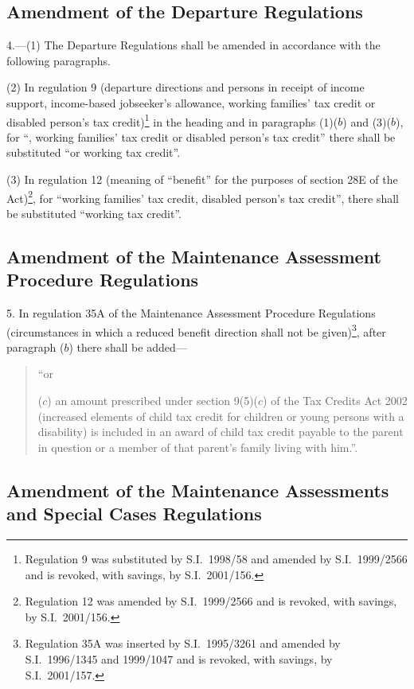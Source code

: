 \documentclass[12pt,a4paper]{article}
\begin{document}
\subsection[4. Amendment of the Departure Regulations]{Amendment of the Departure Regulations}

4.---(1)  The Departure Regulations shall be amended in accordance with the following paragraphs.

(2) In regulation 9 (departure directions and persons in receipt of income support, income-based jobseeker’s allowance, working families' tax credit or disabled person’s tax credit)\footnote{Regulation 9 was substituted by S.I.\ 1998/58 and amended by S.I.\ 1999/2566 and is revoked, with savings, by S.I.\ 2001/156.} in the heading and in paragraphs (1)($b$)  and (3)($b$), for “, working families' tax credit or disabled person’s tax credit” there shall be substituted “or working tax credit”.

(3) In regulation 12 (meaning of “benefit” for the purposes of section 28E of the Act)\footnote{Regulation 12 was amended by S.I.\ 1999/2566 and is revoked, with savings, by S.I.\ 2001/156.}, for “working families' tax credit, disabled person’s tax credit”, there shall be substituted “working tax credit”.

\subsection[5. Amendment of the Maintenance Assessment Procedure Regulations]{Amendment of the Maintenance Assessment Procedure Regulations}

5.  In regulation 35A of the Maintenance Assessment Procedure Regulations (circumstances in which a reduced benefit direction shall not be given)\footnote{Regulation 35A was inserted by S.I.\ 1995/3261 and amended by S.I.\ 1996/1345 and 1999/1047 and is revoked, with savings, by S.I.\ 2001/157.}, after paragraph ($b$)  there shall be added—
\begin{quotation}
    “or

    ($c$) 
    an amount prescribed under section 9(5)($c$)  of the Tax Credits Act 2002 (increased elements of child tax credit for children or young persons with a disability) is included in an award of child tax credit payable to the parent in question or a member of that parent’s family living with him.”. 
\end{quotation}

\subsection[6. Amendment of the Maintenance Assessments and Special Cases Regulations]{\sloppy Amendment of the Maintenance Assessments and Special Cases Regulations}
\end{document}
